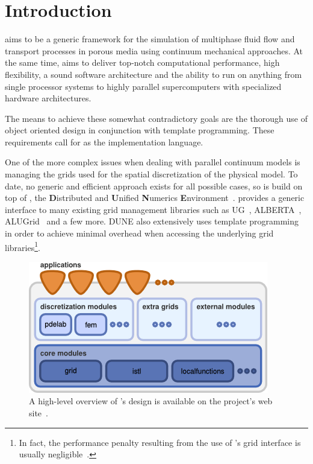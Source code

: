 \chapter{Introduction}

\Dumux aims to be a generic framework for the simulation of multiphase
fluid flow and transport processes in porous media using continuum
mechanical approaches.  At the same time, \Dumux aims to deliver
top-notch computational performance, high flexibility, a sound
software architecture and the ability to run on anything from single
processor systems to highly parallel supercomputers with specialized
hardware architectures.

The means to achieve these somewhat contradictory goals are the
thorough use of object oriented design in conjunction with template
programming. These requirements call for \Cplusplus as the implementation
language.

One of the more complex issues when dealing with parallel continuum
models is managing the grids used for the spatial discretization of
the physical model. To date, no generic and efficient approach exists
for all possible cases, so \Dumux is build on top of \Dune, the
\textbf{D}istributed and \textbf{U}nified \textbf{N}umerics
\textbf{E}nvironment~\cite{DUNE-HP}. \Dune provides a generic interface
to many existing grid management libraries such as UG~\cite{UG-HP},
ALBERTA~\cite{ALBERTA-HP}, ALUGrid~\cite{ALUGRID-HP} and a few
more. DUNE also extensively uses template programming in order to
achieve minimal overhead when accessing the underlying grid
libraries\footnote{In fact, the performance penalty resulting from the
use of \Dune's grid interface is usually negligible~\cite{BURRI2006}.}.
\begin{figure}[hbt]
  \centering 
  \includegraphics[width=.5\linewidth, keepaspectratio]{PNG/dunedesign.png}
  \caption{
    \label{fig:dune-design}
    A high-level overview of \Dune's design is available on the project's
    web site~\cite{DUNE-HP}.
  }
\end{figure}

